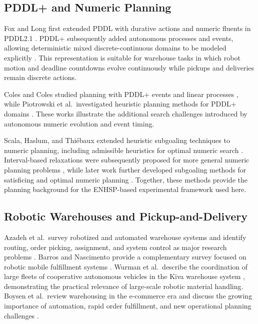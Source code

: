 \documentclass[conference]{IEEEtran}
\begin{document}
\subsection{PDDL+ and Numeric Planning}

Fox and Long first extended PDDL with durative actions and numeric fluents in
PDDL2.1 \cite{fox2003}. PDDL+ subsequently added autonomous processes and
events, allowing deterministic mixed discrete-continuous domains to be modeled
explicitly \cite{fox2006}. This representation is suitable for warehouse tasks
in which robot motion and deadline countdowns evolve continuously while
pickups and deliveries remain discrete actions.

Coles and Coles studied planning with PDDL+ events and linear processes
\cite{coles2014}, while Piotrowski et al.\ investigated heuristic planning
methods for PDDL+ domains \cite{piotrowski2016}. These works illustrate the
additional search challenges introduced by autonomous numeric evolution and
event timing.

Scala, Haslum, and Thi\'ebaux extended heuristic subgoaling techniques to
numeric planning, including admissible heuristics for optimal numeric search
\cite{scala2016subgoal}. Interval-based relaxations were subsequently proposed
for more general numeric planning problems \cite{scala2016interval}, while
later work further developed subgoaling methods for satisficing and optimal
numeric planning \cite{scala2020}. Together, these methods provide the
planning background for the ENHSP-based experimental framework used here.

\subsection{Robotic Warehouses and Pickup-and-Delivery}

Azadeh et al.\ survey robotized and automated warehouse systems and identify
routing, order picking, assignment, and system control as major research
problems \cite{azadeh2019}. Barros and Nascimento provide a complementary
survey focused on robotic mobile fulfillment systems \cite{barros2021}.
Wurman et al.\ describe the coordination of large fleets of cooperative
autonomous vehicles in the Kiva warehouse system \cite{wurman2008},
demonstrating the practical relevance of large-scale robotic material
handling. Boysen et al.\ review warehousing in the e-commerce era and discuss
the growing importance of automation, rapid order fulfillment, and new
operational planning challenges \cite{boysen2019}.
\end{document}

